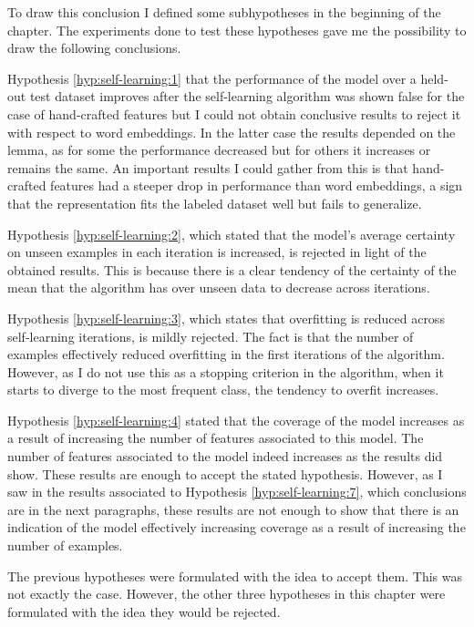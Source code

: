 To draw this conclusion I defined some subhypotheses in the beginning of the
chapter. The experiments done to test these hypotheses gave me the possibility
to draw the following conclusions.

Hypothesis \ref{hyp:self-learning:1} that the performance of the model over a
held-out test dataset improves after the self-learning algorithm was shown
false for the case of hand-crafted features but I could not obtain conclusive
results to reject it with respect to word embeddings. In the latter case the
results depended on the lemma, as for some the performance decreased but for
others it increases or remains the same. An important results I could gather
from this is that hand-crafted features had a steeper drop in performance than
word embeddings, a sign that the representation fits the labeled dataset well
but fails to generalize.

Hypothesis \ref{hyp:self-learning:2}, which stated that the model's average
certainty on unseen examples in each iteration is increased, is rejected in
light of the obtained results. This is because there is a clear tendency of
the certainty of the mean that the algorithm has over unseen data to decrease
across iterations. 

Hypothesis \ref{hyp:self-learning:3}, which states that overfitting is reduced
across self-learning iterations, is mildly rejected. The fact is that the
number of examples effectively reduced overfitting in the first iterations of
the algorithm. However, as I do not use this as a stopping criterion in the
algorithm, when it starts to diverge to the most frequent class, the tendency
to overfit increases.

Hypothesis \ref{hyp:self-learning:4} stated that the coverage of the model
increases as a result of increasing the number of features associated to this
model. The number of features associated to the model indeed increases as the
results did show. These results are enough to accept the stated hypothesis.
However, as I saw in the results associated to Hypothesis
\ref{hyp:self-learning:7}, which conclusions are in the next paragraphs, these
results are not enough to show that there is an indication of the model
effectively increasing coverage as a result of increasing the number of
examples.

The previous hypotheses were formulated with the idea to accept them. This was
not exactly the case. However, the other three hypotheses in this chapter were
formulated with the idea they would be rejected.

